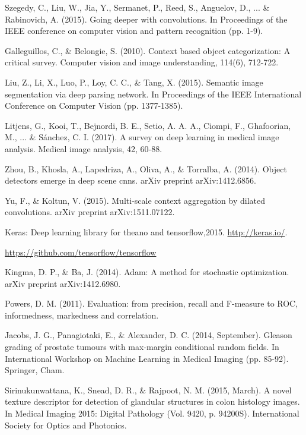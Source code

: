 \documentclass[10pt,twocolumn]{article}
\begin{document}
\begin{thebibliography}{}
Szegedy, C., Liu, W., Jia, Y., Sermanet, P., Reed, S., Anguelov, D., ... \& Rabinovich, A. (2015). Going deeper with convolutions. In Proceedings of the IEEE conference on computer vision and pattern recognition (pp. 1-9).

Galleguillos, C., \& Belongie, S. (2010). Context based object categorization: A critical survey. Computer vision and image understanding, 114(6), 712-722.

Liu, Z., Li, X., Luo, P., Loy, C. C., \& Tang, X. (2015). Semantic image segmentation via deep parsing network. In Proceedings of the IEEE International Conference on Computer Vision (pp. 1377-1385).

Litjens, G., Kooi, T., Bejnordi, B. E., Setio, A. A. A., Ciompi, F., Ghafoorian, M., ... \& Sánchez, C. I. (2017). A survey on deep learning in medical image analysis. Medical image analysis, 42, 60-88.


Zhou, B., Khosla, A., Lapedriza, A., Oliva, A., \& Torralba, A. (2014). Object detectors emerge in deep scene cnns. arXiv preprint arXiv:1412.6856.

Yu, F., \& Koltun, V. (2015). Multi-scale context aggregation by dilated convolutions. arXiv preprint arXiv:1511.07122.

Keras: Deep learning library for theano and tensorflow,2015. \href{http://keras.io/}{http://keras.io/}.

\href{https://github.com/tensorflow/tensorflow}{https://github.com/tensorflow/tensorflow}

Kingma, D. P., \& Ba, J. (2014). Adam: A method for stochastic optimization. arXiv preprint arXiv:1412.6980.


Powers, D. M. (2011). Evaluation: from precision, recall and F-measure to ROC, informedness, markedness and correlation.


Jacobs, J. G., Panagiotaki, E., \& Alexander, D. C. (2014, September). Gleason grading of prostate tumours with max-margin conditional random fields. In International Workshop on Machine Learning in Medical Imaging (pp. 85-92). Springer, Cham.

Sirinukunwattana, K., Snead, D. R., \& Rajpoot, N. M. (2015, March). A novel texture descriptor for detection of glandular structures in colon histology images. In Medical Imaging 2015: Digital Pathology (Vol. 9420, p. 94200S). International Society for Optics and Photonics.



\end{thebibliography}
\end{document}
